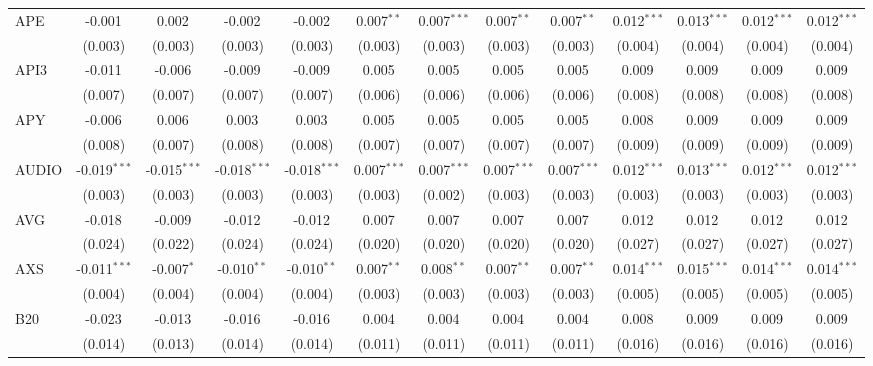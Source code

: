 \begin{table}[!htbp]
\begin{tabular}{@{\extracolsep{5pt}}lcccccccccccc}
 APE & -0.001$^{}$ & 0.002$^{}$ & -0.002$^{}$ & -0.002$^{}$ & 0.007$^{**}$ & 0.007$^{***}$ & 0.007$^{**}$ & 0.007$^{**}$ & 0.012$^{***}$ & 0.013$^{***}$ & 0.012$^{***}$ & 0.012$^{***}$ \\
  & (0.003) & (0.003) & (0.003) & (0.003) & (0.003) & (0.003) & (0.003) & (0.003) & (0.004) & (0.004) & (0.004) & (0.004) \\
 API3 & -0.011$^{}$ & -0.006$^{}$ & -0.009$^{}$ & -0.009$^{}$ & 0.005$^{}$ & 0.005$^{}$ & 0.005$^{}$ & 0.005$^{}$ & 0.009$^{}$ & 0.009$^{}$ & 0.009$^{}$ & 0.009$^{}$ \\
  & (0.007) & (0.007) & (0.007) & (0.007) & (0.006) & (0.006) & (0.006) & (0.006) & (0.008) & (0.008) & (0.008) & (0.008) \\
 APY & -0.006$^{}$ & 0.006$^{}$ & 0.003$^{}$ & 0.003$^{}$ & 0.005$^{}$ & 0.005$^{}$ & 0.005$^{}$ & 0.005$^{}$ & 0.008$^{}$ & 0.009$^{}$ & 0.009$^{}$ & 0.009$^{}$ \\
  & (0.008) & (0.007) & (0.008) & (0.008) & (0.007) & (0.007) & (0.007) & (0.007) & (0.009) & (0.009) & (0.009) & (0.009) \\
 AUDIO & -0.019$^{***}$ & -0.015$^{***}$ & -0.018$^{***}$ & -0.018$^{***}$ & 0.007$^{***}$ & 0.007$^{***}$ & 0.007$^{***}$ & 0.007$^{***}$ & 0.012$^{***}$ & 0.013$^{***}$ & 0.012$^{***}$ & 0.012$^{***}$ \\
  & (0.003) & (0.003) & (0.003) & (0.003) & (0.003) & (0.002) & (0.003) & (0.003) & (0.003) & (0.003) & (0.003) & (0.003) \\
 AVG & -0.018$^{}$ & -0.009$^{}$ & -0.012$^{}$ & -0.012$^{}$ & 0.007$^{}$ & 0.007$^{}$ & 0.007$^{}$ & 0.007$^{}$ & 0.012$^{}$ & 0.012$^{}$ & 0.012$^{}$ & 0.012$^{}$ \\
  & (0.024) & (0.022) & (0.024) & (0.024) & (0.020) & (0.020) & (0.020) & (0.020) & (0.027) & (0.027) & (0.027) & (0.027) \\
 AXS & -0.011$^{***}$ & -0.007$^{*}$ & -0.010$^{**}$ & -0.010$^{**}$ & 0.007$^{**}$ & 0.008$^{**}$ & 0.007$^{**}$ & 0.007$^{**}$ & 0.014$^{***}$ & 0.015$^{***}$ & 0.014$^{***}$ & 0.014$^{***}$ \\
  & (0.004) & (0.004) & (0.004) & (0.004) & (0.003) & (0.003) & (0.003) & (0.003) & (0.005) & (0.005) & (0.005) & (0.005) \\
 B20 & -0.023$^{}$ & -0.013$^{}$ & -0.016$^{}$ & -0.016$^{}$ & 0.004$^{}$ & 0.004$^{}$ & 0.004$^{}$ & 0.004$^{}$ & 0.008$^{}$ & 0.009$^{}$ & 0.009$^{}$ & 0.009$^{}$ \\
  & (0.014) & (0.013) & (0.014) & (0.014) & (0.011) & (0.011) & (0.011) & (0.011) & (0.016) & (0.016) & (0.016) & (0.016) \\

\end{tabular}
\end{table}
